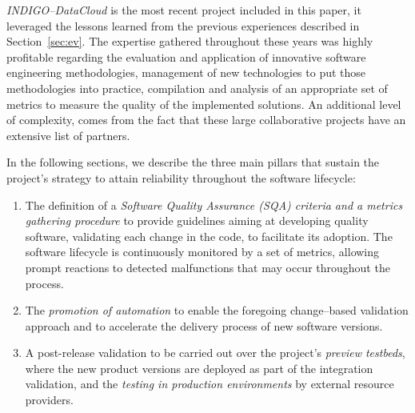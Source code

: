 \documentclass[journal]{IEEEtran}
\begin{document}
{\sl INDIGO--DataCloud} is the most recent project included in this paper, it
leveraged the lessons learned from the previous experiences described in
Section~\ref{sec:ev}. The expertise gathered throughout these years was highly
profitable regarding the evaluation and application of innovative software engineering
methodologies, management of new technologies to put those methodologies
into practice, compilation and analysis of an appropriate set of metrics to measure the
quality of the implemented solutions.
An additional level of complexity, comes from the fact that these large collaborative projects
have an extensive list of partners.

In the following sections, we describe the three main pillars that sustain the project's strategy to attain reliability throughout the
software lifecycle:
\begin{enumerate}
    \item The definition of a \textit{Software Quality Assurance (SQA) criteria and a metrics gathering procedure} to provide guidelines
    aiming at developing quality software, validating each change in the code, to facilitate its adoption. The software lifecycle is
    continuously monitored by a set of metrics, allowing prompt reactions to detected malfunctions that may occur throughout the process. 
    \item The \textit{promotion of automation} to enable the foregoing change--based validation approach and to accelerate the delivery
    process of new software versions.
    \item A post-release validation to be carried out over the project's \textit{preview testbeds}, where the new product versions
    are deployed as part of the integration validation, and the \textit{testing in production environments} by external resource providers.
\end{enumerate}
\end{document}
